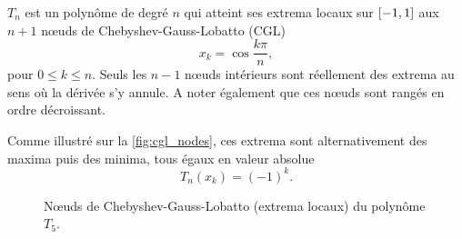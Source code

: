 
$T_n$ est un polynôme de degré $n$ %
qui atteint ses extrema locaux sur $\left[ -1, 1 \right]$ aux $n+1$ n\oe uds de Chebyshev-Gauss-Lobatto (CGL)%
\begin{equation}
	x_k = \cos \frac{k \pi}{n},
	\label{eq:cgl_nodes}
\end{equation}
pour $0 \leq k \leq n$. 
Seuls les $n-1$ n\oe uds intérieurs sont réellement des extrema au sens où la dérivée s'y annule. 
A noter également que ces n\oe uds sont rangés en ordre décroissant.\par
Comme illustré sur la \autoref{fig:cgl_nodes}, ces extrema sont alternativement des maxima puis des minima, tous égaux en valeur absolue
\begin{equation}
	T_n(x_k) = (-1)^{k}.
	\label{eq:chebyshev_equioscillation}
\end{equation}

\begin{figure}
	\centering
	
	\caption{N\oe uds de Chebyshev-Gauss-Lobatto (extrema locaux) du polynôme $T_5$.}%
	\label{fig:cgl_nodes}
\end{figure}

